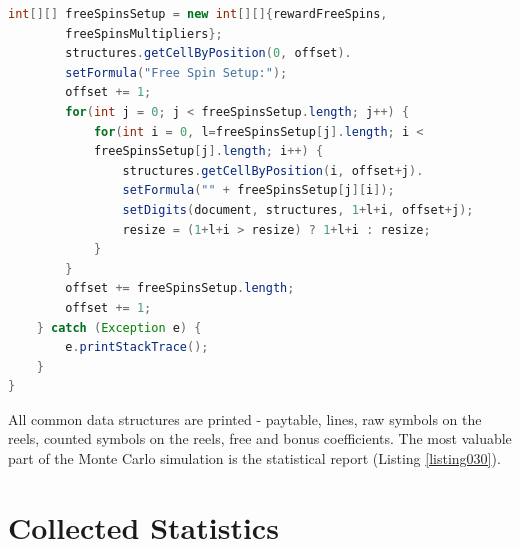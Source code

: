 \documentclass[12pt,twoside,openany]{book}
\begin{document}
\begin{lstlisting}[language=Java, caption={Data structures report}, label=listing029]
		int[][] freeSpinsSetup = new int[][]{rewardFreeSpins,
		freeSpinsMultipliers};
		structures.getCellByPosition(0, offset).
		setFormula("Free Spin Setup:");
		offset += 1;
		for(int j = 0; j < freeSpinsSetup.length; j++) {
			for(int i = 0, l=freeSpinsSetup[j].length; i <
			freeSpinsSetup[j].length; i++) {
				structures.getCellByPosition(i, offset+j).
				setFormula("" + freeSpinsSetup[j][i]);
				setDigits(document, structures, 1+l+i, offset+j);
				resize = (1+l+i > resize) ? 1+l+i : resize;
			}
		}
		offset += freeSpinsSetup.length;
		offset += 1;
	} catch (Exception e) {
		e.printStackTrace();
	}
}
\end{lstlisting}

All common data structures are printed - paytable, lines, raw symbols on the reels, counted symbols on the reels, free and bonus coefficients. The most valuable part of the Monte Carlo simulation is the statistical report (Listing \ref{listing030}).

\section*{Collected Statistics}
\end{document}
